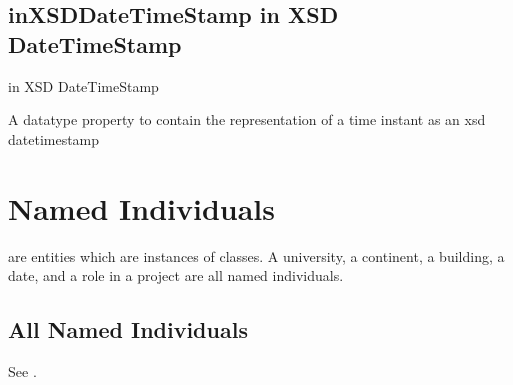 \documentclass[letterpaper,10pt,english]{sphinxmanual}
\begin{document}
\section{inXSDDateTimeStamp \sphinxhyphen{} in XSD Date\sphinxhyphen{}Time\sphinxhyphen{}Stamp}
\label{\detokenize{doc-inXSDDateTimeStamp:inxsddatetimestamp-in-xsd-date-time-stamp}}\label{\detokenize{doc-inXSDDateTimeStamp:index-0}}\label{\detokenize{doc-inXSDDateTimeStamp::doc}}
\begin{sphinxShadowBox}

\sphinxAtStartPar
in XSD Date\sphinxhyphen{}Time\sphinxhyphen{}Stamp
\end{sphinxShadowBox}

\begin{sphinxShadowBox}

\sphinxAtStartPar
{}
\end{sphinxShadowBox}

\begin{sphinxShadowBox}

\sphinxAtStartPar
A datatype property to contain the representation of a time instant as an xsd datetimestamp
\end{sphinxShadowBox}

\begin{sphinxShadowBox}

\sphinxAtStartPar
{}
\end{sphinxShadowBox}


\chapter{Named Individuals}
\label{\detokenize{named-individuals:named-individuals}}\label{\detokenize{named-individuals::doc}}
\sphinxAtStartPar
{} are entities which are instances of classes.  A university, a
continent, a building, a date, and a role in a project are all named individuals.


\section{All Named Individuals}
\label{\detokenize{named-individuals:all-named-individuals}}
\sphinxAtStartPar
See {\hyperref[\detokenize{named-individuals:table-9}]{}}.
\end{document}
